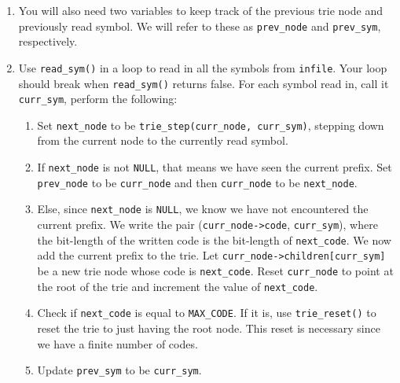 \documentclass{article}
\begin{document}
\begin{enumerate}
    \item You will also need two variables to keep track of the previous
      trie node and previously read symbol. We will refer to these as
      \texttt{prev\_node} and \texttt{prev\_sym}, respectively.

    \item Use \texttt{read\_sym()} in a loop to read in all the symbols
      from \texttt{infile}. Your loop should break when
      \texttt{read\_sym()} returns false. For each symbol read in, call
      it \texttt{curr\_sym}, perform the following:

        \begin{enumerate}
            \item Set \texttt{next\_node} to be \texttt{trie\_step(curr\_node,
                curr\_sym)}, stepping down from the current node to the
                currently read symbol.

            \item If \texttt{next\_node} is not \texttt{NULL}, that means we
                have seen the current prefix. Set \texttt{prev\_node} to be
                \texttt{curr\_node} and then \texttt{curr\_node} to be
                \texttt{next\_node}.

            \item Else, since \texttt{next\_node} is \texttt{NULL}, we know we
                have not encountered the current prefix. We write the pair
                (\texttt{curr\_node->code}, \texttt{curr\_sym}), where the
                bit-length of the written code is the bit-length of
                \texttt{next\_code}. We now add the current prefix to the trie.
                Let \texttt{curr\_node->children[curr\_sym]} be a new trie node
                whose code is \texttt{next\_code}. Reset \texttt{curr\_node} to
                point at the root of the trie and increment the value of
                \texttt{next\_code}.

            \item Check if \texttt{next\_code} is equal to \texttt{MAX\_CODE}.
                If it is, use \texttt{trie\_reset()} to reset the trie to just
                having the root node. This reset is necessary since we have a
                finite number of codes.

            \item Update \texttt{prev\_sym} to be \texttt{curr\_sym}.
        \end{enumerate}


\end{enumerate}
\end{document}

